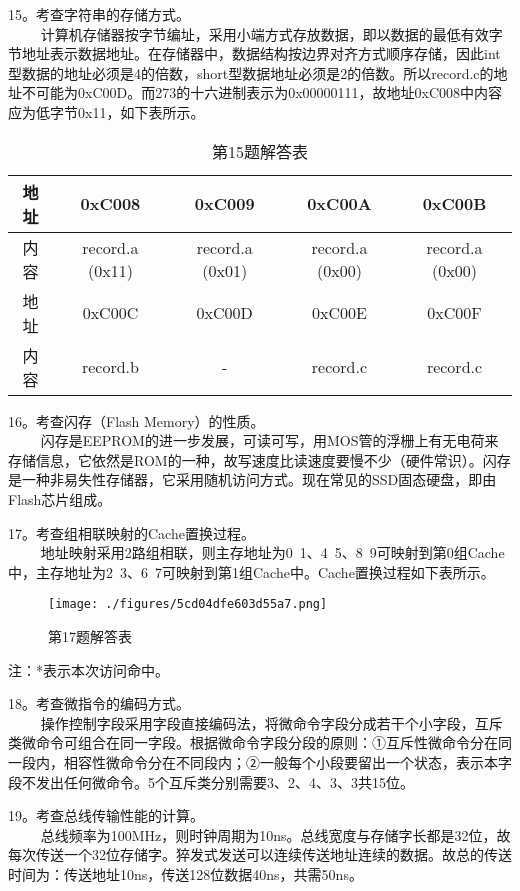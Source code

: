 15。考查字符串的存储方式。\\
$\qquad$ 计算机存储器按字节编址，采用小端方式存放数据，即以数据的最低有效字节地址表示数据地址。在存储器中，数据结构按边界对齐方式顺序存储，因此int型数据的地址必须是4的倍数，short型数据地址必须是2的倍数。所以record.c的地址不可能为0xC00D。而273的十六进制表示为0x00000111，故地址0xC008中内容应为低字节0x11，如下表所示。
\begin{table}[ht]
\centering
\caption{第15题解答表}\label{tab_CSN12_6}
\begin{tabular}{|c|c|c|c|c|}
\hline
地址 & 0xC008 & 0xC009 & 0xC00A & 0xC00B \\
\hline
内容 & record.a (0x11) & record.a (0x01) & record.a (0x00) & record.a (0x00) \\
\hline
地址 & 0xC00C & 0xC00D & 0xC00E & 0xC00F \\
\hline
内容 & record.b & - & record.c & record.c \\
\hline
\end{tabular}
\end{table}

16。考查闪存（Flash Memory）的性质。\\
$\qquad$ 闪存是EEPROM的进一步发展，可读可写，用MOS管的浮栅上有无电荷来存储信息，它依然是ROM的一种，故写速度比读速度要慢不少（硬件常识）。闪存是一种非易失性存储器，它采用随机访问方式。现在常见的SSD固态硬盘，即由Flash芯片组成。

17。考查组相联映射的Cache置换过程。\\
$\qquad$ 地址映射采用2路组相联，则主存地址为0~1、4~5、8~9可映射到第0组Cache中，主存地址为2~3、6~7可映射到第1组Cache中。Cache置换过程如下表所示。
\begin{figure}[ht]
\centering
\texttt{[image: ./figures/5cd04dfe603d55a7.png]}
\caption{第17题解答表} \label{fig_CSN12_12}
\end{figure}
注：*表示本次访问命中。

18。考查微指令的编码方式。\\
$\qquad$ 操作控制字段采用字段直接编码法，将微命令字段分成若干个小字段，互斥类微命令可组合在同一字段。根据微命令字段分段的原则：①互斥性微命令分在同一段内，相容性微命令分在不同段内；②一般每个小段要留出一个状态，表示本字段不发出任何微命令。5个互斥类分别需要3、2、4、3、3共15位。

19。考查总线传输性能的计算。\\
$\qquad$ 总线频率为100MHz，则时钟周期为10ns。总线宽度与存储字长都是32位，故每次传送一个32位存储字。猝发式发送可以连续传送地址连续的数据。故总的传送时间为：传送地址10ns，传送128位数据40ns，共需50ns。


